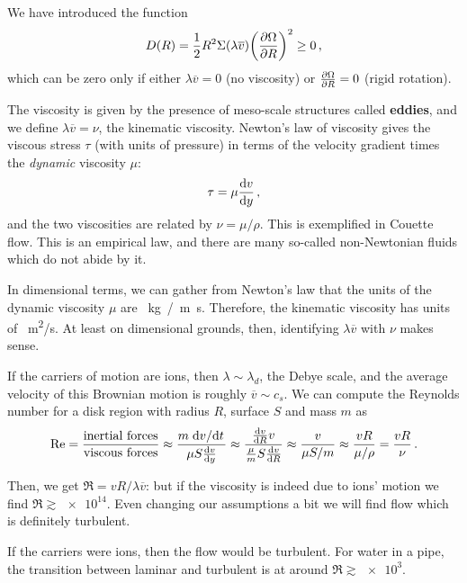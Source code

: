 \documentclass[main.tex]{subfiles}
\begin{document}

We have introduced the function 
%
\begin{align}
D(R) = \frac{1}{2} R^2 \Sigma (\lambda \overline{v})
\qty(\pdv{\Omega }{R})^2 \geq 0
\,,
\end{align}
%
which can be zero only if either \(\lambda \overline{v} = 0\) (no viscosity) or \(\pdv{\Omega }{R} = 0\) (rigid rotation). 

The viscosity is given by the presence of meso-scale structures called \textbf{eddies}, and we define \(\lambda \overline{v} = \nu\), the kinematic viscosity. 
Newton's law of viscosity gives the viscous stress \(\tau \) (with units of pressure) in terms of the velocity gradient times the \emph{dynamic} viscosity \(\mu \): 
%
\begin{align}
\tau = \mu \dv{v}{y}
\,,
\end{align}
%
and the two viscosities are related by \(\nu = \mu / \rho \). 
This is exemplified in Couette flow. 
This is an empirical law, and there are many so-called non-Newtonian fluids which do not abide by it.  

In dimensional terms, we can gather from Newton's law that the units of the dynamic viscosity \(\mu \) are \SI{}{kg / m s}. 
Therefore, the kinematic viscosity has units of \SI{}{m^2/s}.
At least on dimensional grounds, then, identifying \(\lambda \overline{v}\) with \(\nu \) makes sense. 

If the carriers of motion are ions, then \(\lambda \sim \lambda _d\), the Debye scale, and the average velocity of this Brownian motion is roughly \(\overline{v} \sim c_s\). 
We can compute the Reynolds number for a disk region with radius \(R\),  surface \(S\) and mass \(m\) as 
%
\begin{align}
\Re = \frac{\text{inertial  forces}}{\text{viscous forces}}
\approx \frac{m\dv*{v}{t}}{ \mu S \dv{v}{y}} \approx \frac{\dv{v}{R} v}{\frac{\mu }{m} S \dv{v}{R}} \approx \frac{v}{\mu S / m} \approx \frac{vR}{\mu / \rho } = \frac{vR}{\nu }
\,.
\end{align}

Then, we get \(\Re = v R / \lambda \overline{v}\): but if the viscosity is indeed due to ions' motion we find \(\Re \gtrsim \num{e14}\). 
Even changing our assumptions a bit we will find flow which is definitely turbulent. 

If the carriers were ions, then the flow would be turbulent. 
For water in a pipe, the transition between laminar and turbulent is at around \(\Re \gtrsim \num{e3}\). 
\end{document}
